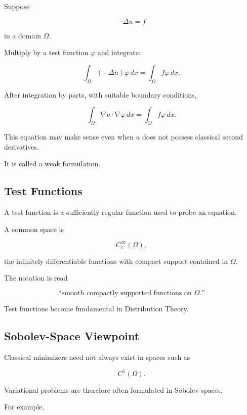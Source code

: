 Suppose

\[
-\Delta u=f
\]

in a domain \(\Omega\).

Multiply by a test function \(\varphi\) and integrate:

\[
\int_\Omega
(-\Delta u)\varphi\,dx
=
\int_\Omega
f\varphi\,dx.
\]

After integration by parts, with suitable boundary conditions,

\[
\boxed{
\int_\Omega
\nabla u\cdot\nabla\varphi\,dx
=
\int_\Omega
f\varphi\,dx.
}
\]

This equation may make sense even when \(u\) does not possess classical
second derivatives.

It is called a weak formulation.

\subsection{Test Functions}
\label{subsec:variational-test-functions}

A test function is a sufficiently regular function used to probe an
equation.

A common space is

\[
\boxed{
C_c^\infty(\Omega),
}
\]

the infinitely differentiable functions with compact support contained
in \(\Omega\).

The notation is read

\[
\boxed{
\text{``smooth compactly supported functions on }\Omega\text{.''}
}
\]

Test functions become fundamental in Distribution Theory.

\subsection{Sobolev-Space Viewpoint}
\label{subsec:variational-sobolev-viewpoint}

Classical minimizers need not always exist in spaces such as

\[
C^1(\Omega).
\]

Variational problems are therefore often formulated in Sobolev spaces.

For example,

